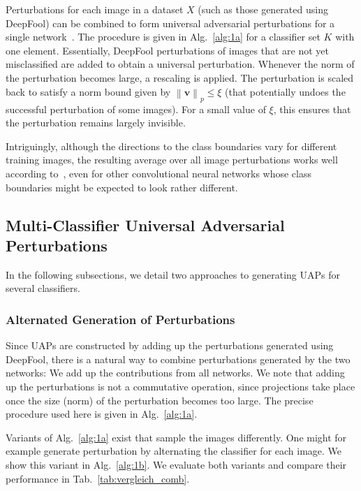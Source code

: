 \documentclass[runningheads]{llncs}
\begin{document}
Perturbations for each image in a dataset \(X\) (such as those generated using DeepFool) can be combined to form universal adversarial perturbations for a single network~\cite{moosavidezfooli_universal_2017}. The procedure is given in Alg.~\ref{alg:1a} for a classifier set $K$ with one element. Essentially, DeepFool perturbations of images that are not yet misclassified are added to obtain a universal perturbation. 
Whenever the norm of the perturbation becomes large, a rescaling is applied. The perturbation is scaled back to satisfy a norm bound given by \(\left\|\mathbf{v}\right\|_p\leq\xi\) (that potentially undoes the successful perturbation of some images). For a small value of \(\xi\), this ensures that the perturbation remains largely invisible.

Intriguingly, although the directions to the class boundaries vary for different training images, the resulting average over all image perturbations works well according to~\cite{moosavidezfooli_universal_2017}, even for other convolutional neural networks whose class boundaries might be expected to look rather different. 

\subsection{Multi-Classifier Universal Adversarial Perturbations}\label{sec:MultUAP}

In the following subsections, we detail two approaches to generating UAPs for several classifiers.

\subsubsection{Alternated Generation of Perturbations}
Since UAPs are constructed by adding up the perturbations generated using DeepFool, there is a natural way to combine perturbations generated by the two networks: We add up the contributions from all networks. We note that adding up the perturbations is not a commutative operation, since projections take place once the size (norm) of the perturbation becomes too large. The precise procedure used here is given in Alg.~\ref{alg:1a}. 

Variants of Alg.~\ref{alg:1a} exist that sample the images differently. One might for example generate perturbation by alternating the classifier for each image. We show this variant in Alg.~\ref{alg:1b}. We evaluate both variants and compare their performance in Tab.~\ref{tab:vergleich_comb}. 
 
\end{document}
